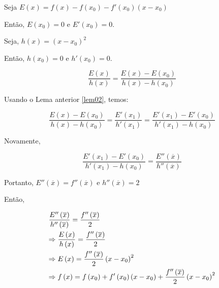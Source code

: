 \documentclass[11pt, oneside, a4paper]{gsm-l}
\begin{document}
\begin{dem}
Seja $E\left( x \right) = f\left( x \right) - f\left( {x_0 } \right) - f'\left( {x_0 } \right)\left( {x - x_0 } \right)$

Então, $E\left( {x_0 } \right) = 0$ e $E'\left( {x_0 } \right) = 0$.

Seja, $h\left( x \right) = \left( {x - x_0 } \right)^2$

Então, $h\left( {x_0 } \right) = 0$ e $h'\left( {x_0 } \right) = 0$.

\[
\frac{{E\left( x \right)}}
{{h\left( x \right)}} = \frac{{E\left( x \right) - E\left( {x_0 } \right)}}
{{h\left( x \right) - h\left( {x_0 } \right)}}
\]

Usando o Lema anterior \ref{lem02}, temos:

\[
\frac{{E\left( x \right) - E\left( {x_0 } \right)}}
{{h\left( x \right) - h\left( {x_0 } \right)}} = \frac{{E'\left( {x_1 } \right)}}
{{h'\left( {x_1 } \right)}} = \frac{{E'\left( {x_1 } \right) - E'\left( {x_0 } \right)}}
{{h'\left( {x_1 } \right) - h\left( {x_0 } \right)}}
\]

Novamente,

\[
\frac{{E'\left( {x_1 } \right) - E'\left( {x_0 } \right)}}
{{h'\left( {x_1 } \right) - h\left( {x_0 } \right)}} = \frac{{E''\left( {\overline x } \right)}}
{{h''\left( {\overline x } \right)}}
\]

Portanto, $E''\left( {\overline x } \right) = f''\left( {\overline x } \right)$ e $h''\left( {\overline x } \right) = 2$

Então,

\[
\begin{gathered}
\frac{{E''\left( {\overline x } \right)}}
{{h''\left( {\overline x } \right)}} = \frac{{f''\left( {\overline x } \right)}}
{2} \hfill \\
\Rightarrow \frac{{E\left( x \right)}}
{{h\left( x \right)}} = \frac{{f''\left( {\overline x } \right)}}
{2} \hfill \\
\Rightarrow E\left( x \right) = \frac{{f''\left( {\overline x } \right)}}
{2}\left( {x - x_0 } \right)^2  \hfill \\
   \Rightarrow f\left( x \right) = f\left( {x_0 } \right) + f'\left( {x_0 } \right)\left( {x - x_0 } \right) + \frac{{f''\left( {\overline x } \right)}}
{2}\left( {x - x_0 } \right)^2  \hfill \\
\end{gathered}
\]

\end{dem}
\end{document}
